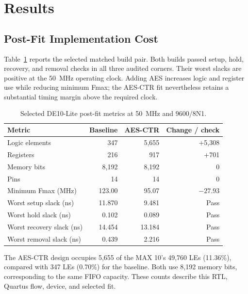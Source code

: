 \documentclass[runningheads]{llncs}
\newcommand{\BaselineLE}{347}
\newcommand{\BaselineReg}{216}
\newcommand{\BaselineFmax}{123.00}
\newcommand{\SecureLEPrint}{5,655}
\newcommand{\SecureReg}{917}
\newcommand{\SecureFmax}{95.07}
\begin{document}
\section{Results}
\subsection{Post-Fit Implementation Cost}
Table~\ref{tab:fit} reports the selected matched build pair. Both builds passed setup, hold, recovery, and removal checks in all three audited corners. Their worst slacks are positive at the 50~MHz operating clock. Adding AES increases logic and register use while reducing minimum Fmax; the AES-CTR fit nevertheless retains a substantial timing margin above the required clock.

\begin{table}[H]
\caption{Selected DE10-Lite post-fit metrics at 50~MHz and 9600/8N1.}
\label{tab:fit}
\centering
\small
\begin{tabular}{lrrr}
\hline
Metric & Baseline & AES-CTR & Change / check \\
\hline
Logic elements & \BaselineLE{} & \SecureLEPrint{} & +5,308 \\
Registers & \BaselineReg{} & \SecureReg{} & +701 \\
Memory bits & 8,192 & 8,192 & 0 \\
Pins & 14 & 14 & 0 \\
Minimum Fmax (MHz) & \BaselineFmax{} & \SecureFmax{} & $-27.93$ \\
Worst setup slack (ns) & 11.870 & 9.481 & Pass \\
Worst hold slack (ns) & 0.102 & 0.089 & Pass \\
Worst recovery slack (ns) & 14.454 & 13.184 & Pass \\
Worst removal slack (ns) & 0.439 & 2.216 & Pass \\
\hline
\end{tabular}
\end{table}

The AES-CTR design occupies 5,655 of the MAX 10's 49,760 LEs (11.36\%), compared with 347 LEs (0.70\%) for the baseline. Both use 8,192 memory bits, corresponding to the same FIFO capacity. These counts describe this RTL, Quartus flow, device, and selected fit.
\end{document}
